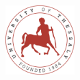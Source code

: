 \begin{titlepage}
\includegraphics[width=0.2\textwidth]{Images/uth_logo}\\[1cm] %
 

\vfill %

\end{titlepage}
%